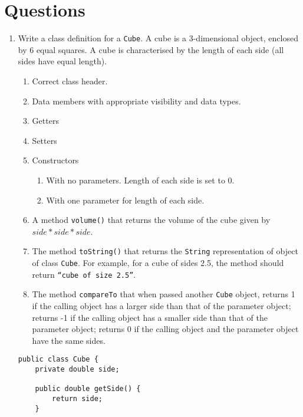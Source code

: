 \section*{Questions}
\begin{questions}

\question 

\begin{enumerate}
\item Write a class definition for a \texttt{Cube}. A cube is a 3-dimensional object, enclosed by 6 equal squares. A cube is characterised by the length of each side (all sides have equal length).

\begin{enumerate}
\item Correct class header.
\item Data members with appropriate visibility and data types.
\item Getters
\item Setters
\item Constructors
	\begin{enumerate}
		\item With no parameters. Length of each side is set to 0.
		\item With one parameter for length of each side.
	\end{enumerate}
\item A method \texttt{volume()} that returns the volume of the cube given by $side * side * side$.

\item The method \texttt{toString()} that returns the \texttt{String} representation of object of class \texttt{Cube}. For example, for a cube of sides 2.5, the method should return \texttt{``cube of size 2.5''}.

\item The method \texttt{compareTo} that when passed another \texttt{Cube} object, returns 1 if the calling object has a larger side than that of the parameter object; returns -1 if the calling object has a smaller side than that of the parameter object; returns 0 if the calling object and the parameter object have the same sides.

\end{enumerate}

\begin{solution}
\newpage
\begin{lstlisting}
public class Cube {
	private double side;

	public double getSide() {
		return side;
	}


\end{lstlisting}
\end{solution}
\end{enumerate}
\end{questions}
